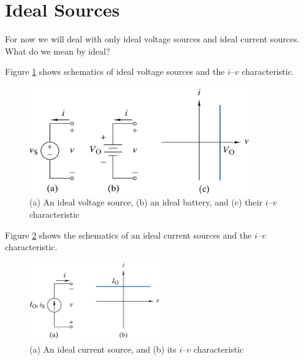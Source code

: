 \documentclass{handout}
\begin{document}
\newpage

\section{Ideal Sources}
For now we will deal with only ideal voltage sources and ideal current sources.  What do we mean by ideal?


Figure \ref{fig: Ideal_Voltage_Source} shows schematics of ideal voltage sources and the  $i$--$v$ characteristic.

\begin{figure}[h b t]
\centering
\includegraphics[width=0.85\textwidth]{Ideal_Voltage_Source.jpg}
\caption{(a) An ideal voltage source,  (b) an ideal battery, and (c) their $i$--$v$ characteristic}
\label{fig: Ideal_Voltage_Source}
\end{figure}

Figure \ref{fig: Ideal_Current_Source} shows the schematics of an ideal current sources and the  $i$--$v$ characteristic.

\begin{figure}[h b t]
\centering
\includegraphics[width=0.5\textwidth]{Ideal_Current_Source.jpg}
\caption{(a) An ideal current source, and  (b) its $i$--$v$ characteristic}
\label{fig: Ideal_Current_Source}
\end{figure}
\end{document}

